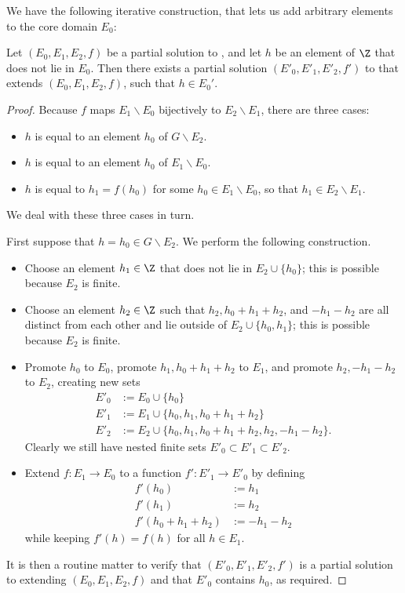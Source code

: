 We have the following iterative construction, that lets us add arbitrary elements to the core domain $E_0$:

\begin{lemma}\label{iteration} Let $(E_0, E_1, E_2, f)$ be a partial solution to , and let $h$ be an element of $\Z$ that does not lie in $E_0$.  Then there exists a partial solution $(E'_0, E'_1, E'_2, f')$ to  that extends $(E_0, E_1, E_2, f)$, such that $h \in E_0'$.
\end{lemma}

\begin{proof}  Because $f$ maps $E_1 \backslash E_0$ bijectively to $E_2 \backslash E_1$, there are three cases:
\begin{itemize}
  \item $h$ is equal to an element $h_0$ of $G \backslash E_2$.
  \item $h$ is equal to an element $h_0$ of $E_1 \backslash E_0$.
  \item $h$ is equal to $h_1 = f(h_0)$ for some $h_0 \in E_1 \backslash E_0$, so that $h_1 \in E_2 \backslash E_1$.
\end{itemize}

We deal with these three cases in turn.

First suppose that $h = h_0\in G \backslash E_2$.  We perform the following construction.

\begin{itemize}
  \item Choose an element $h_1 \in \Z$ that does not lie in $E_2 \cup \{h_0\}$; this is possible because $E_2$ is finite.
  \item Choose an element $h_2 \in \Z$ such that $h_2, h_0+h_1+h_2$, and $-h_1-h_2$ are all distinct from each other and lie outside of $E_2 \cup \{h_0, h_1\}$; this is possible because $E_2$ is finite.
  \item Promote $h_0$ to $E_0$, promote $h_1, h_0+h_1+h_2$ to $E_1$, and promote $h_2, -h_1-h_2$ to $E_2$, creating new sets
  \begin{align*}
    E'_0 &:= E_0 \cup \{h_0\} \\
    E'_1 &:= E_1 \cup \{h_0, h_1, h_0+h_1+h_2\} \\
    E'_2 &:= E_2 \cup \{h_0, h_1, h_0+h_1+h_2, h_2, -h_1-h_2\}.
  \end{align*}
  Clearly we still have nested finite sets $E'_0 \subset E'_1 \subset E'_2$.
  \item Extend $f : E_1 \to E_0$ to a function $f': E'_1 \to E'_0$ by defining
  \begin{align*}
    f'(h_0) &:= h_1 \\
    f'(h_1) &:= h_2 \\
    f'(h_0+h_1+h_2) &:= -h_1-h_2
  \end{align*}
  while keeping $f'(h)=f(h)$ for all $h \in E_1$.
\end{itemize}
It is then a routine matter to verify that $(E'_0,E'_1,E'_2,f')$ is a partial solution to  extending $(E_0,E_1,E_2,f)$ and that $E'_0$ contains $h_0$, as required.


\end{proof}

